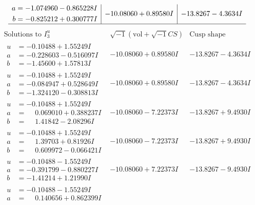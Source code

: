 \documentclass[1p]{elsarticle_modified}
\theoremstyle{definition}
\newcommand{\I}{\sqrt{-1}}
\begin{document}
$$\begin{array}{c|c|c}
\begin{aligned}
a &= -1.074960 - 0.865228 I \\
b &= -0.825212 + 0.300777 I\end{aligned}
 & -10.08060 + 0.89580 I & -13.8267 - 4.3634 I\\
 \hline 
 \end{array}$$\newpage$$\begin{array}{c|c|c}  
\text{Solutions to }I^u_{3}& \I (\text{vol} + \sqrt{-1}CS) & \text{Cusp shape}\\
 \hline 
\begin{aligned}
u &= -0.10488 + 1.55249 I \\
a &= -0.228603 - 0.516097 I \\
b &= -1.45600 + 1.57813 I\end{aligned}
 & -10.08060 + 0.89580 I & -13.8267 - 4.3634 I \\ \hline\begin{aligned}
u &= -0.10488 + 1.55249 I \\
a &= -0.084947 + 0.528649 I \\
b &= -1.324120 - 0.308813 I\end{aligned}
 & -10.08060 + 0.89580 I & -13.8267 - 4.3634 I \\ \hline\begin{aligned}
u &= -0.10488 + 1.55249 I \\
a &= \phantom{-}0.069010 + 0.388237 I \\
b &= \phantom{-}1.41842 - 2.08296 I\end{aligned}
 & -10.08060 - 7.22373 I & -13.8267 + 9.4930 I \\ \hline\begin{aligned}
u &= -0.10488 + 1.55249 I \\
a &= \phantom{-}1.39703 + 0.81926 I \\
b &= \phantom{-}0.609972 - 0.066421 I\end{aligned}
 & -10.08060 - 7.22373 I & -13.8267 + 9.4930 I \\ \hline\begin{aligned}
u &= -0.10488 - 1.55249 I \\
a &= -0.391799 - 0.880227 I \\
b &= -1.41214 + 1.21990 I\end{aligned}
 & -10.08060 + 7.22373 I & -13.8267 - 9.4930 I \\ \hline\begin{aligned}
u &= -0.10488 - 1.55249 I \\
a &= \phantom{-}0.140656 + 0.862399 I \\

\end{aligned}
\end{array}$$
\end{document}
